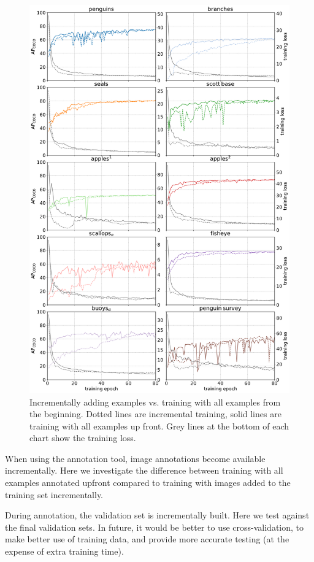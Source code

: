\documentclass[conference]{IEEEtran}
\begin{document}
\begin{figure}[ht]
  \centering
  \includegraphics[width=1.0\linewidth]{figures/incremental.pdf}
  \caption{Incrementally adding examples vs. training with all examples from the beginning. Dotted lines are incremental training, solid lines are training with all examples up front. Grey lines at the bottom of each chart show the training loss.}  
  \label{fig:incremental}
\end{figure}

When using the annotation tool, image annotations become available incrementally. Here we investigate the difference between training with all examples annotated upfront compared to training with images added to the training set incrementally. 

During annotation, the validation set is incrementally built. Here we test against the final validation sets. In future, it would be better to use cross-validation, to make better use of training data, and provide more accurate testing (at the expense of extra training time). 
\end{document}
